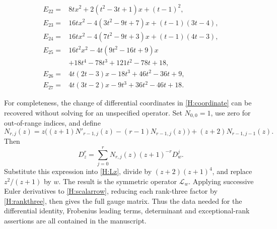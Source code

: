 \documentclass[11pt]{article}
\numberwithin{equation}{section}
\begin{document}
\begin{align*}
E_{22}={}&8tx^2+2(t^2-3t+1)x+(t-1)^2,\\
E_{23}={}&16tx^2-4(3t^2-9t+7)x+(t-1)(3t-4),\\
E_{24}={}&16tx^2-4(7t^2-9t+3)x+(t-1)(4t-3),\\
E_{25}={}&16t^2x^2-4t(9t^2-16t+9)x\\
&+18t^4-78t^3+121t^2-78t+18,\\
E_{26}={}&4t(2t-3)x-18t^3+46t^2-36t+9,\\
E_{27}={}&4t(3t-2)x-9t^3+36t^2-46t+18.
\end{align*}

For completeness, the change of differential coordinates in \eqref{H:coordinate} can be recovered without solving for an unspecified operator. Set $N_{0,0}=1$, use zero for out-of-range indices, and define
\[
N_{r,j}(z)=z\bigl((z+1)N'_{r-1,j}(z)-(r-1)N_{r-1,j}(z)\bigr)
+(z+2)N_{r-1,j-1}(z).
\]
Then
\[
D_z^r=\sum_{j=0}^rN_{r,j}(z)(z+1)^{-r}D_w^j.
\]
Substitute this expression into \eqref{H:Lz}, divide by $(z+2)(z+1)^4$, and replace $z^2/(z+1)$ by $w$. The result is the symmetric operator $\mathcal L_w$. Applying successive Euler derivatives to \eqref{H:scalarrow}, reducing each rank-three factor by \eqref{H:rankthree}, then gives the full gauge matrix. Thus the data needed for the differential identity, Frobenius leading terms, determinant and exceptional-rank assertions are all contained in the manuscript.
\end{document}
